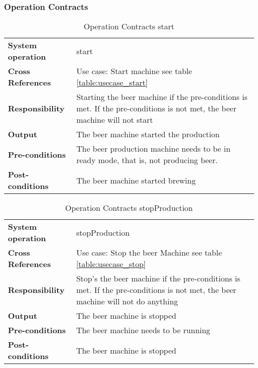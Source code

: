\subsubsection{Operation Contracts}
\begin{table}[H]
    \begin{tabularx}{\textwidth}{|>{\RaggedRight}p{3.7cm}|>{\RaggedRight}X|}
        \hline
        \multicolumn{2}{|c|}{\textbf{start}}\\
        \hline
        \textbf{System operation} & start\\
        \hline
        \textbf{Cross References} & Use case: Start machine see table \ref{table:usecase_start} \\
        \hline
        \textbf{Responsibility} & Starting the beer machine if the pre-conditions 
        is met.
            If the pre-conditions is not met, the beer machine will not start \\
        \hline
        \textbf{Output} & The beer machine started the production\\
        \hline
        \textbf{Pre-conditions} & 
            The beer production machine needs to be in
            ready mode, that is, not producing beer. \\
        \hline
        \textbf{Post-conditions} & The beer machine started brewing\\
        \hline
    \end{tabularx}
    \caption{Operation Contracts start} 
    \label{table:Operation_Contracts_start}
\end{table}

\begin{table}[H]
    \begin{tabularx}{\textwidth}{|>{\RaggedRight}p{3.7cm}|>{\RaggedRight}X|}
        \hline
        \multicolumn{2}{|c|}{\textbf{stopProduction}}\\
        \hline
        \textbf{System operation} & stopProduction\\
        \hline
        \textbf{Cross References} & Use case: Stop the beer Machine see table \ref{table:usecase_stop}\\
        \hline
        \textbf{Responsibility} & Stop's the beer machine if the pre-conditions is met.
        If the pre-conditions is not met, the beer machine will not do anything\\
        \hline
        \textbf{Output} & The beer machine is stopped\\
        \hline
        \textbf{Pre-conditions} & The beer machine needs to be running\\
        \hline
        \textbf{Post-conditions} & The beer machine is stopped\\
        \hline
    \end{tabularx}
    \caption{Operation Contracts stopProduction} 
    \label{table:Operation_Contracts_stopProduction}
\end{table}



